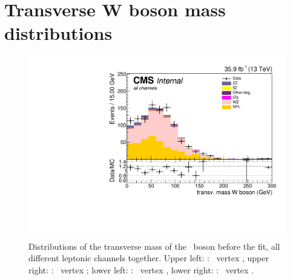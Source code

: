 \section{Transverse W boson mass distributions}
\label{app:MTW}
\begin{figure}[htbp]
	\centering
	\includegraphics[width=0.49\linewidth]{6_Search/Figures/MTWstack/AllBkg/MTW_all_Stack}
	\caption{Distributions of the transverse mass of the \PW\ boson before the fit, all different leptonic channels together. Upper left: \TTSR: \Zut\ vertex , upper right: \TTSR: \Zct\ vertex ; lower left: \STSR: \Zut\ vertex , lower right: \STSR: \Zct\ vertex .}
	\label{fig:mtwallstack}
\end{figure}
